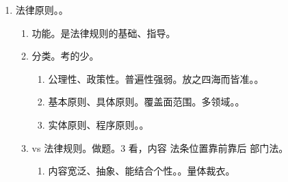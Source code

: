 \begin{enumerate}
\begin{enumerate}
\begin{enumerate}
\begin{enumerate}
                          \item 强行性、任意性。法定优先还是约定优先。。
                        \end{enumerate}
                  \item vs 法律条文。内容与形式（外在），无对应关系。。
                        \begin{enumerate}
                          \item 规范性条文。表达法律规则、法律原则。
                          \item 非规范性条文。如表达概念。
                        \end{enumerate}
                  \item vs 语言。
                        \begin{enumerate}
                          \item 法律规则依赖语言、通过语言表达、通过解释传达含义。
                          \item 规范语句。表达法律规则的语句。命令句、允许句。等道义助动词。
                          \item 陈述句也可传达法律规则 \yjt 把道义助动词加进去不改变原含义。
                        \end{enumerate}
                \end{enumerate}
          \item 法律原则。。
                \begin{enumerate}
                  \item 功能。是法律规则的基础、指导。
                  \item 分类。考的少。
                        \begin{enumerate}
                          \item 公理性、政策性。普遍性强弱。放之四海而皆准。。
                          \item 基本原则、具体原则。覆盖面范围。多领域。。
                          \item 实体原则、程序原则。。
                        \end{enumerate}
                  \item vs 法律规则。做题。3 看，内容 \yjt 法条位置靠前靠后 \yjt 部门法。
                        \begin{enumerate}
                          \item 内容宽泛、抽象、能结合个性。。量体裁衣。

\end{enumerate}
\end{enumerate}
\end{enumerate}
\end{enumerate}
